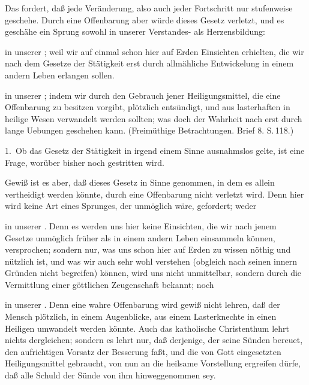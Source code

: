 Das  fordert, daß jede Veränderung, also auch jeder Fortschritt nur stufenweise geschehe. Durch eine Offenbarung aber würde dieses Gesetz verletzt, und es geschähe ein Sprung sowohl in unserer Verstandes- als Herzensbildung:
\begin{aufzb}
\item in unserer ; weil wir auf einmal schon hier auf Erden Einsichten erhielten, die wir nach dem Gesetze der Stätigkeit erst durch allmähliche Entwickelung in einem andern Leben erlangen sollen.
\item in unserer ; indem wir durch den Gebrauch jener Heiligungsmittel, die eine Offenbarung zu besitzen vorgibt, plötzlich entsündigt, und aus lasterhaften in heilige Wesen verwandelt werden sollten; was doch der Wahrheit nach erst durch lange Uebungen geschehen kann. (Freimüthige Betrachtungen. Brief 8. S.\,118.)~
\end{aufzb}\par
{} 1.~Ob das Gesetz der Stätigkeit in irgend einem Sinne ausnahmslos gelte, ist eine Frage, worüber bisher noch gestritten wird.
\begin{aufza}\setcounter{enumi}{1}
\item Gewiß ist es aber, daß dieses Gesetz in  Sinne genommen, in dem es allein vertheidigt werden könnte, durch eine Offenbarung nicht verletzt wird. Denn hier wird keine Art eines Sprunges, der unmöglich wäre, gefordert; weder
\begin{aufzb}
\item in unserer . Denn es werden uns hier keine Einsichten, die wir nach jenem Gesetze unmöglich früher als in einem andern Leben einsammeln können, versprochen; sondern nur, was uns schon hier auf Erden zu wissen nöthig und nützlich ist, und was wir auch sehr wohl verstehen (obgleich nach seinen innern Gründen nicht begreifen) können, wird uns nicht unmittelbar, sondern durch die Vermittlung einer göttlichen Zeugenschaft bekannt; noch
\item in unserer . Denn eine wahre Offenbarung wird gewiß nicht lehren, daß der Mensch plötzlich, in einem Augenblicke, aus einem Lasterknechte in einen Heiligen umwandelt werden könnte. Auch das katholische Christenthum lehrt nichts dergleichen; sondern es lehrt nur, daß derjenige, der seine Sünden bereuet, den aufrichtigen Vorsatz der Besserung faßt, und die von Gott eingesetzten Heiligungsmittel gebraucht, von nun an die heilsame Vorstellung ergreifen dürfe, daß alle Schuld der Sünde von ihm hinweggenommen sey.
\end{aufzb}
\end{aufza}

